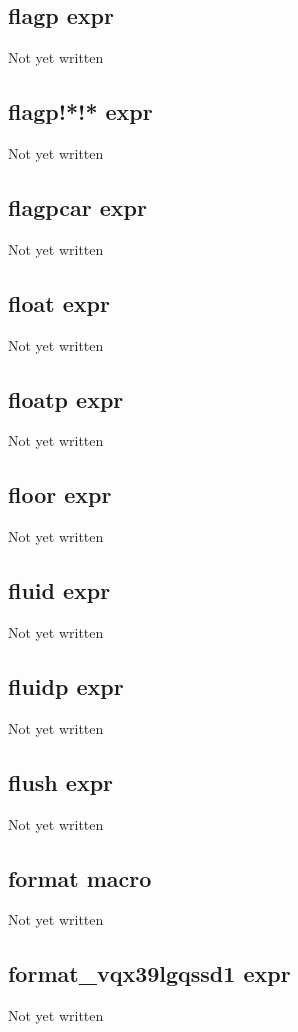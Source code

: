 \documentclass[a4paper,11pt]{article}
\begin{document}
\subsection{\ttfamily flagp expr}
Not yet written

\subsection{\ttfamily flagp!*!* expr}
Not yet written

\subsection{\ttfamily flagpcar expr}
Not yet written

\subsection{\ttfamily float expr}
Not yet written

\subsection{\ttfamily floatp expr}
Not yet written

\subsection{\ttfamily floor expr}
Not yet written

\subsection{\ttfamily fluid expr}
Not yet written

\subsection{\ttfamily fluidp expr}
Not yet written

\subsection{\ttfamily flush expr}
Not yet written

\subsection{\ttfamily format macro}
Not yet written

\subsection{\ttfamily format\_vqx39lgqssd1 expr}
Not yet written
\end{document}
